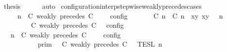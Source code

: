 \begin{isabellebody}
\ {\isacharquery}thesis\isanewline
\ \ \ \ \isamarkupfalse%
\ auto\isanewline
{}\isamarkupfalse%
%
\endisatagproof
{\isafoldproof}%
%
\isadelimproof
\isanewline
%
\endisadelimproof
\isanewline
{}\isamarkupfalse%
\ configuration{\isacharunderscore}interp{\isacharunderscore}stepwise{\isacharunderscore}weakly{\isacharunderscore}precedes{\isacharunderscore}cases{\isacharcolon}\isanewline
\ \ \ {\isacartoucheopen}{\isasymlbrakk}\ {\isasymGamma}{\isacharcomma}\ n\ {\isasymturnstile}\ {\isacharparenleft}{\isacharparenleft}C\ weakly\ precedes\ C\ {\isacharhash}\ {\isasymPsi}{\isacharparenright}\ {\isasymtriangleright}\ {\isasymPhi}\ {\isasymrbrakk}\isactrlsub c\isactrlsub o\isactrlsub n\isactrlsub f\isactrlsub i\isactrlsub g\isanewline
\ \ \ \ {\isacharequal}\ {\isasymlbrakk}\ {\isacharparenleft}{\isacharparenleft}{\isasymlceil}{\isacharhash}\isactrlsup {\isasymle}\ C\ n{\isacharcomma}\ {\isacharhash}\isactrlsup {\isasymle}\ C\ n{\isasymrceil}\ {\isasymin}\ {\isacharparenleft}{\isasymlambda}{\isacharparenleft}x{\isacharcomma}y{\isacharparenright}{\isachardot}\ x{\isasymle}y{\isacharparenright}{\isacharparenright}\ {\isacharhash}\ {\isasymGamma}{\isacharparenright}{\isacharcomma}\ n\isanewline
\ \ \ \ \ \ {\isasymturnstile}\ {\isasymPsi}\ {\isasymtriangleright}\ {\isacharparenleft}{\isacharparenleft}C\ weakly\ precedes\ C\ {\isacharhash}\ {\isasymPhi}{\isacharparenright}\ {\isasymrbrakk}\isactrlsub c\isactrlsub o\isactrlsub n\isactrlsub f\isactrlsub i\isactrlsub g{\isacartoucheclose}\isanewline
%
\isadelimproof
%
\endisadelimproof
%
\isatagproof
{}\isamarkupfalse%
\ {\isacharminus}\isanewline
\ \ \isamarkupfalse%
\ {\isacartoucheopen}{\isasymlbrakk}\ {\isasymGamma}{\isacharcomma}\ n\ {\isasymturnstile}\ {\isacharparenleft}C\ weakly\ precedes\ C\ {\isacharhash}\ {\isasymPsi}\ {\isasymtriangleright}\ {\isasymPhi}\ {\isasymrbrakk}\isactrlsub c\isactrlsub o\isactrlsub n\isactrlsub f\isactrlsub i\isactrlsub g\isanewline
\ \ \ \ \ \ \ \ {\isacharequal}\ {\isasymlbrakk}{\isasymlbrakk}\ {\isasymGamma}\ {\isasymrbrakk}{\isasymrbrakk}\isactrlsub p\isactrlsub r\isactrlsub i\isactrlsub m\ {\isasyminter}\ {\isasymlbrakk}{\isasymlbrakk}\ {\isacharparenleft}C\ weakly\ precedes\ C\ {\isacharhash}\ {\isasymPsi}\ {\isasymrbrakk}{\isasymrbrakk}\isactrlsub T\isactrlsub E\isactrlsub S\isactrlsub L\isactrlbsup {\isasymge}\ n\isactrlesup \isanewline

\end{isabellebody}
